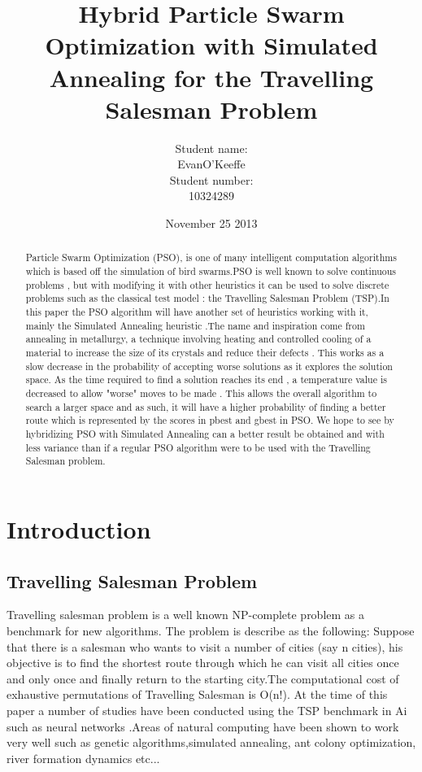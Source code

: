 \documentclass{article}[]
\begin{document}
\title{{\bf Hybrid Particle Swarm Optimization with Simulated Annealing for the Travelling Salesman Problem }\\ }

\author{Student name:\\\vspace{0.5cm}EvanO'Keeffe\\ 
 Student number:\\ \vspace{0.5cm} 10324289}

\date{November 25 2013}
\maketitle
\begin{abstract}
Particle Swarm Optimization (PSO), is one of many intelligent computation algorithms which is based off the simulation of bird swarms.PSO is well known to solve continuous problems , but with modifying it with other heuristics it can be used to solve discrete problems such as the classical test model : the Travelling Salesman Problem (TSP).In this paper the PSO algorithm will have another set of heuristics working with it, mainly the Simulated Annealing heuristic .The name and inspiration come from annealing in metallurgy, a technique involving heating and controlled cooling of a material to increase the size of its crystals and reduce their defects . This works as a slow decrease in the probability of accepting worse solutions as it explores the solution space. As the time required to find a solution reaches its end , a temperature value is decreased to allow "worse" moves to be made . This allows the overall algorithm to search a larger space and as such, it will have a higher probability of finding a better route which is represented by the scores in pbest and gbest in PSO. We hope to see by hybridizing PSO with Simulated Annealing can a better result be obtained and with less variance than if a regular PSO algorithm were to be used with the Travelling Salesman problem.
\end{abstract}

\section{Introduction}
\subsection{Travelling Salesman Problem}
Travelling salesman problem is a well known NP-complete problem as a benchmark for new algorithms. The problem is describe as the following: Suppose that there is a salesman who wants to visit a number of cities (say n cities), his objective is to find the shortest route through which he can visit all cities once and only once and finally return to the starting city.The computational cost of exhaustive permutations of Travelling Salesman is O(n!). At the time of this paper a number of studies have been conducted using the TSP benchmark in Ai such as neural networks\cite{Gee1995} .Areas of natural computing have been shown to work very well such as genetic algorithms\cite{Ray2004},simulated annealing\cite{Song2003}, ant colony optimization\cite{Dorigo1996}, river formation dynamics\cite{Afaq2011} etc...
\end{document}
